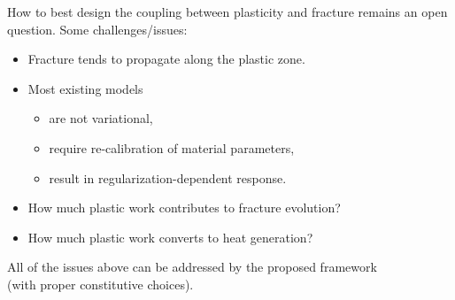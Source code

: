 \begin{frame}
\begin{columns}
\begin{column}{0.8\textwidth}
      How to best design the coupling between plasticity and fracture remains an open question. Some challenges/issues:
      \begin{itemize}
        \item Fracture tends to propagate along the plastic zone.
              \pause
        \item Most existing models
              \begin{itemize}
                \item are not variational,
                      \pause
                \item require re-calibration of material parameters,
                      \pause
                \item result in regularization-dependent response.
                      \pause
              \end{itemize}
        \item How much plastic work contributes to fracture evolution?
              \pause
        \item How much plastic work converts to heat generation?
      \end{itemize}
      
      \bigskip
      \pause
      
      \begin{block}{}
        \centering
        \vspace{1em}
        All of the issues above can be addressed by the proposed framework \\
        (with proper constitutive choices).
        \vspace{1em}
      \end{block}
    \end{column}
  \end{columns}
\end{frame}


